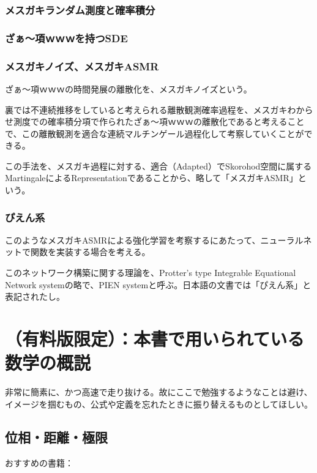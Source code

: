 \documentclass{jsarticle}
\begin{document}
\subsubsection{メスガキランダム測度と確率積分}


\subsubsection{ざぁ～項ｗｗｗを持つSDE}

\subsubsection{メスガキノイズ、メスガキASMR}

ざぁ～項ｗｗｗの時間発展の離散化を、メスガキノイズという。

裏では不連続推移をしていると考えられる離散観測確率過程を、メスガキわからせ測度での確率積分項で作られたざぁ～項ｗｗｗの離散化であると考えることで、この離散観測を適合な連続マルチンゲール過程化して考察していくことができる。

この手法を、メスガキ過程に対する、適合（Adapted）でSkorohod空間に属するMartingaleによるRepresentationであることから、略して「メスガキASMR」という。


\subsubsection{ぴえん系}

このようなメスガキASMRによる強化学習を考察するにあたって、ニューラルネットで関数を実装する場合を考える。

このネットワーク構築に関する理論を、Protter's type Integrable Equational Network systemの略で、PIEN systemと呼ぶ。日本語の文書では「ぴえん系」と表記されたし。



\newpage
\section{（有料版限定）：本書で用いられている数学の概説}
非常に簡素に、かつ高速で走り抜ける。故にここで勉強するようなことは避け、イメージを掴むもの、公式や定義を忘れたときに振り替えるものとしてほしい。


\subsection{位相・距離・極限}
おすすめの書籍：
\end{document}
